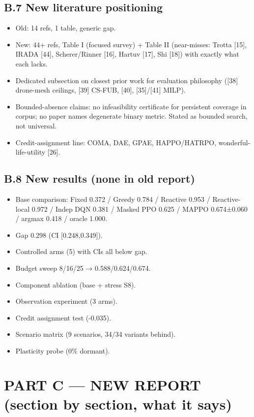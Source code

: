 \documentclass[10pt]{article}
\begin{document}
\subsection{B.7 New literature positioning}
\begin{itemize}
\item Old: 14 refs, 1 table, generic gap.
\item New: 44+ refs, Table I (focused survey) + Table II (near-misses: Trotta [15], IRADA [44], Scherer/Rinner [16], Hartuv [17], Shi [18]) with exactly what each lacks.
\item Dedicated subsection on closest prior work for evaluation philosophy ([38] drone-mesh ceilings, [39] CS-FUB, [40], [35]/[41] MILP).
\item Bounded-absence claims: no infeasibility certificate for persistent coverage in corpus; no paper names degenerate binary metric. Stated as bounded search, not universal.
\item Credit-assignment line: COMA, DAE, GPAE, HAPPO/HATRPO, wonderful-life-utility [26].
\end{itemize}

\subsection{B.8 New results (none in old report)}
\begin{itemize}
\item Base comparison: Fixed 0.372 / Greedy 0.784 / Reactive 0.953 / Reactive-local 0.972 / Indep DQN 0.381 / Masked PPO 0.625 / MAPPO 0.674±0.060 / argmax 0.418 / oracle 1.000.
\item Gap 0.298 (CI [0.248,0.349]).
\item Controlled arms (5) with CIs all below gap.
\item Budget sweep 8/16/25 → 0.588/0.624/0.674.
\item Component ablation (base + stress S8).
\item Observation experiment (3 arms).
\item Credit assignment test (-0.035).
\item Scenario matrix (9 scenarios, 34/34 variants behind).
\item Plasticity probe (0\% dormant).
\end{itemize}

\section{PART C --- NEW REPORT (section by section, what it says)}
\end{document}
